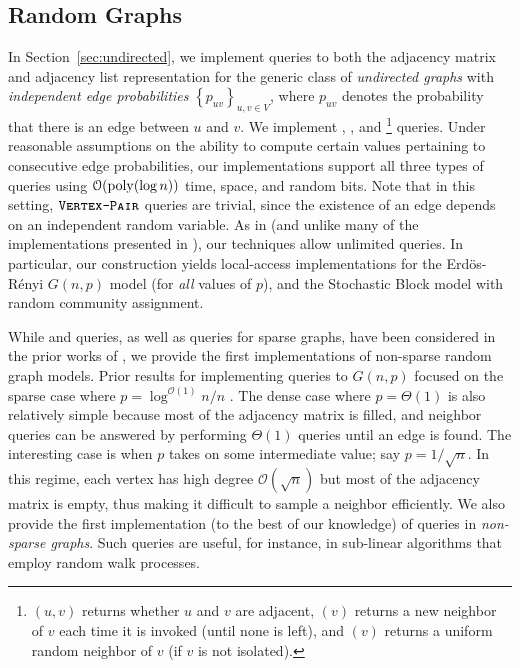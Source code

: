 \subsection{Random Graphs}%
\label{sec:random_graphs}
In Section~\ref{sec:undirected}, we implement queries to both the adjacency matrix and adjacency list representation
for the generic class of \emph{undirected graphs} with {\em independent edge probabilities} $\left\{ p_{uv} \right\}_{u,v\in V}$,
where $p_{uv}$ denotes the probability that there is an edge between $u$ and $v$.
We implement , , and 
\footnote{$(u,v)$ returns whether $u$ and $v$ are adjacent, $(v)$ returns a new neighbor of $v$ each time
it is invoked (until none is left), and $(v)$ returns a uniform random neighbor of $v$ (if $v$ is not isolated).} queries.
Under reasonable assumptions on the ability to compute certain values pertaining to consecutive edge probabilities,
our implementations support all three types of queries using $\mathcal{O}(\mathrm{poly}(\log n))$ time, space, and random bits.
Note that in this setting, $\texttt{\textsc{Vertex-Pair}}$ queries are trivial, since the existence of an edge depends on an independent random variable.
As in \cite{reut} (and unlike many of the implementations presented in \cite{huge_old,huge}), our techniques allow unlimited queries.
In particular, our construction yields local-access implementations for the Erd\"{o}s-R\'{e}nyi $G(n,p)$ model (for \emph{all} values of $p$),
and the Stochastic Block model with random community assignment.


While  and  queries, as well as  queries for sparse graphs,
have been considered in the prior works of \cite{reut, huge_old, huge, sparse},
we provide the first implementations of non-sparse random graph models.
Prior results for implementing queries to $G(n,p)$ focused on the sparse case where $p = \log^{\mathcal O(1)} n/n$ \cite{sparse}.
The dense case where $p = \Theta(1)$ is also relatively simple because most of the adjacency matrix is filled,
and neighbor queries can be answered by performing $\Theta(1)$  queries until an edge is found.
The interesting case is when $p$ takes on some intermediate value; say $p = 1/\sqrt{n}$.
In this regime, each vertex has high degree $\mathcal O(\sqrt{n})$ but most of the adjacency matrix is empty,
thus making it difficult to sample a neighbor efficiently.
We also provide the first implementation (to the best of our knowledge) of  queries in \emph{non-sparse graphs}.
Such queries are useful, for instance, in sub-linear algorithms that employ random walk processes.


